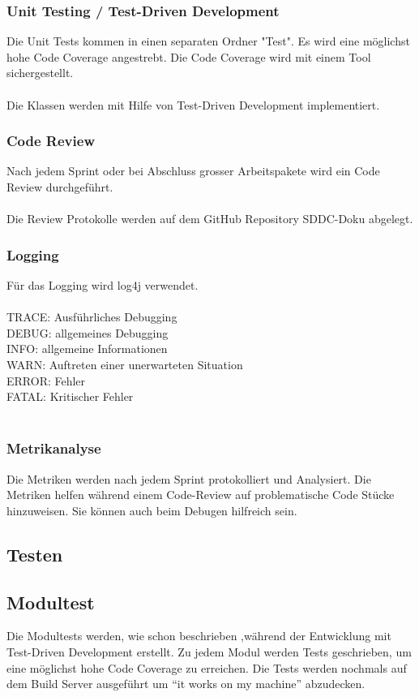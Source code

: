 \subsubsection{Unit Testing / Test-Driven Development}
Die Unit Tests kommen in einen separaten Ordner "Test".
Es wird eine möglichst hohe Code Coverage angestrebt.
Die Code Coverage wird mit einem Tool sichergestellt.\\
\\
Die Klassen werden mit Hilfe von Test-Driven Development implementiert.

\subsubsection{Code Review}
Nach jedem Sprint oder bei Abschluss grosser Arbeitspakete wird ein Code Review durchgeführt.\\
\\
Die Review Protokolle werden auf dem GitHub Repository SDDC-Doku abgelegt.

\subsubsection{Logging}
Für das Logging wird log4j verwendet.\\
\\
TRACE: Ausführliches Debugging\\
DEBUG: allgemeines Debugging\\
INFO: allgemeine Informationen\\
WARN: Auftreten einer unerwarteten Situation\\
ERROR: Fehler\\
FATAL: Kritischer Fehler\\
\\

\subsubsection{Metrikanalyse}
Die Metriken werden nach jedem Sprint protokolliert und Analysiert. 
Die Metriken helfen während einem Code-Review auf problematische 
Code Stücke hinzuweisen. Sie können auch beim Debugen hilfreich sein.


\subsection{Testen}

\subsection{Modultest}
Die Modultests werden, wie schon beschrieben ,während der Entwicklung mit Test-Driven Development erstellt.
Zu jedem Modul werden Tests geschrieben, um eine möglichst hohe Code 
Coverage zu erreichen.
Die Tests werden nochmals auf dem Build Server ausgeführt um ``it 
works on my machine'' abzudecken.\\

